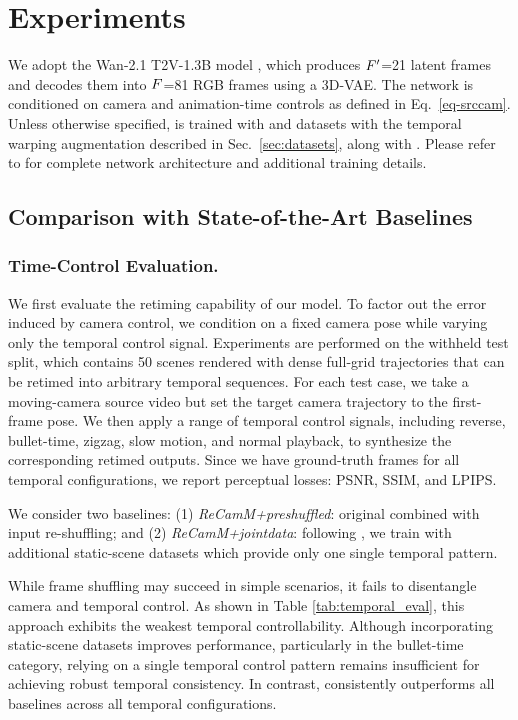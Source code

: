 

\section{Experiments}

We adopt the Wan-2.1 T2V-1.3B model \cite{wan2025}, which produces $F'$=21 latent frames and decodes them into $F$=81 RGB frames using a 3D-VAE.
The network is conditioned on camera and animation-time controls as defined in Eq.~\ref{eq-srccam}.  
Unless otherwise specified, \nameMethod is trained with \recammaster and \syncammaster datasets with the temporal warping augmentation described in Sec.~\ref{sec:datasets}, along with \nameDataset. Please refer to \suppmat for complete network architecture and additional training details.  
\subsection{Comparison with State-of-the-Art Baselines}
\subsubsection{Time-Control Evaluation.}
\label{sec:eval:time_control}
We first evaluate the retiming capability of our model. 
To factor out the error induced by camera control, we condition \nameMethod on a fixed camera pose while varying only the temporal control signal. Experiments are performed on the withheld \nameDataset test split, which contains 50 scenes rendered with dense full-grid trajectories that can be retimed into arbitrary temporal sequences.
For each test case, we take a moving-camera source video but set the target camera trajectory to the first-frame pose. 
We then apply a range of temporal control signals, including reverse, bullet-time, zigzag, slow motion, and normal playback, to synthesize the corresponding retimed outputs. 
Since we have ground-truth frames for all temporal configurations, we report perceptual losses: PSNR, SSIM, and LPIPS.

We consider two baselines:
(1) \textit{ReCamM+preshuffled}: original \recammaster combined with input re-shuffling; and
(2) \textit{ReCamM+jointdata}: following \cite{watson2025controllingspacetimediffusion,Wu2024}, we train \recammaster with additional static-scene datasets \cite{zhou2018stereo,li2019mannequin} which provide only one single temporal pattern.

While frame shuffling may succeed in simple scenarios, it fails to disentangle camera and temporal control.
As shown in Table \ref{tab:temporal_eval}, this approach exhibits the weakest temporal controllability.
Although incorporating static-scene datasets improves performance, particularly in the bullet-time category, relying on a single temporal control pattern remains insufficient for achieving robust temporal consistency.
In contrast, \nameMethod consistently outperforms all baselines across all temporal configurations.

